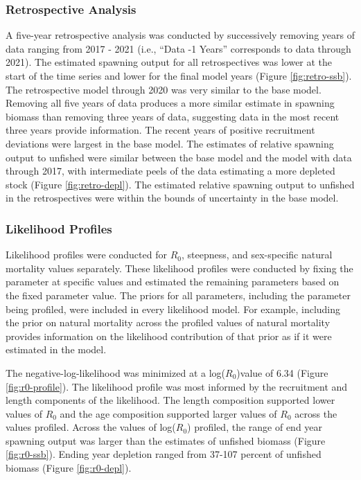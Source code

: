 \documentclass[11pt,
  english,
  letterpaper,
]{article}
\begin{document}
\hypertarget{retrospective-analysis}{%
\subsubsection{Retrospective Analysis}\label{retrospective-analysis}}

A five-year retrospective analysis was conducted by successively removing years of data ranging from 2017 - 2021 (i.e., ``Data -1 Years'' corresponds to data through 2021). The estimated spawning output for all retrospectives was lower at the start of the time series and lower for the final model years (Figure \ref{fig:retro-ssb}). The retrospective model through 2020 was very similar to the base model. Removing all five years of data produces a more similar estimate in spawning biomass than removing three years of data, suggesting data in the most recent three years provide information. The recent years of positive recruitment deviations were largest in the base model. The estimates of relative spawning output to unfished were similar between the base model and the model with data through 2017, with intermediate peels of the data estimating a more depleted stock (Figure \ref{fig:retro-depl}). The estimated relative spawning output to unfished in the retrospectives were within the bounds of uncertainty in the base model.

\hypertarget{likelihood-profiles}{%
\subsubsection{Likelihood Profiles}\label{likelihood-profiles}}

Likelihood profiles were conducted for \(R_0\), steepness, and sex-specific natural mortality values separately. These likelihood profiles were conducted by fixing the parameter at specific values and estimated the remaining parameters based on the fixed parameter value. The priors for all parameters, including the parameter being profiled, were included in every likelihood model. For example, including the prior on natural mortality across the profiled values of natural mortality provides information on the likelihood contribution of that prior as if it were estimated in the model.

The negative-log-likelihood was minimized at a log(\(R_0\))value of 6.34 (Figure \ref{fig:r0-profile}). The likelihood profile was most informed by the recruitment and length components of the likelihood. The length composition supported lower values of \(R_0\) and the age composition supported larger values of \(R_0\) across the values profiled. Across the values of log(\(R_0\)) profiled, the range of end year spawning output was larger than the estimates of unfished biomass (Figure \ref{fig:r0-ssb}). Ending year depletion ranged from 37-107 percent of unfished biomass (Figure \ref{fig:r0-depl}).
\end{document}
